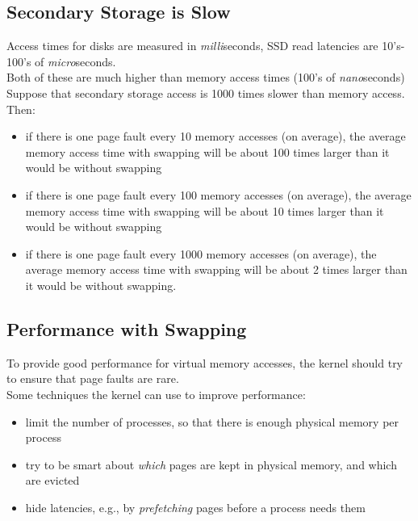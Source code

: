 \documentclass[12pt]{article}
\theoremstyle{plain}
\theoremstyle{definition}
\begin{document}
\subsection{Secondary Storage is Slow}
Access times for disks are measured in \emph{milli}seconds, SSD read latencies are 10’s-100’s of \emph{micro}seconds. \\

Both of these are much higher than memory access times (100’s of \emph{nano}seconds) \\

Suppose that secondary storage access is 1000 times slower than memory access.
Then:
\begin{itemize}
  \item if there is one page fault every 10 memory accesses (on average), the average memory access time with swapping will be about 100 times larger than it would be without swapping
  \item if there is one page fault every 100 memory accesses (on average), the average memory access time with swapping will be about 10 times larger than it would be without swapping
  \item if there is one page fault every 1000 memory accesses (on average), the average memory access time with swapping will be about 2 times larger than it would be without swapping.
\end{itemize}

\subsection{Performance with Swapping}
To provide good performance for virtual memory accesses, the kernel should try to ensure that page faults are rare. \\

Some techniques the kernel can use to improve performance:
\begin{itemize}
  \item limit the number of processes, so that there is enough physical memory per process
  \item try to be smart about \emph{which} pages are kept in physical memory, and which are evicted
  \item hide latencies, e.g., by \emph{prefetching} pages before a process needs them
\end{itemize}
\end{document}
